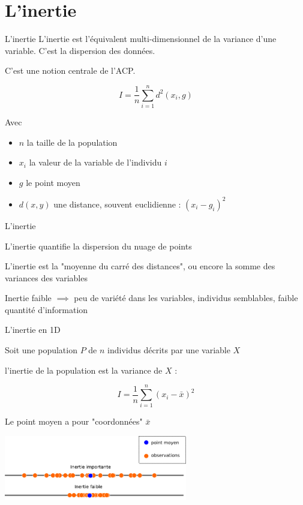 \documentclass{beamer}
\begin{document}
\section{L'inertie}


\begin{frame}{L'inertie}
L'inertie est l'équivalent \alert{multi-dimensionnel} de la \alert{variance} d'une variable. C'est la \alert{dispersion} des données.


C'est une notion centrale de l'ACP.


$$I= \frac{1}{n}\sum_{i=1}^n d^2(x_i,g)$$

Avec 
\begin{itemize}
\item $n$ la taille de la population 
\item $x_i$ la valeur de la variable de l'individu $i$ 
\item $g$ le point moyen 
\item $d(x,y)$ une distance, souvent euclidienne : $(x_i-g_i)^2$ 
\end{itemize}
\end{frame}


\begin{frame}{L'inertie}

L'inertie quantifie la \alert{dispersion} du nuage de points

L'inertie est la "moyenne du carré des distances", ou encore la \alert{somme des variances} des variables

Inertie faible $\implies$ peu de variété dans les variables, individus semblables, faible quantité d'information
\end{frame}


\begin{frame}{L'inertie en 1D}


Soit une population $P$ de $n$ individus décrits par une variable $X$

l'inertie de la population est la \alert{variance} de $X$ : 

$$I= \frac{1}{n}\sum_{i=1}^n (x_i-\bar{x})^2$$

Le point moyen a pour "coordonnées" $\bar{x}$

\vspace{0.5cm}

\begin{center}
\colorbox{white}{\includegraphics[width=0.6\textwidth,keepaspectratio]{img/inertie_1D.png}}
\end{center}


\end{frame}
\end{document}
